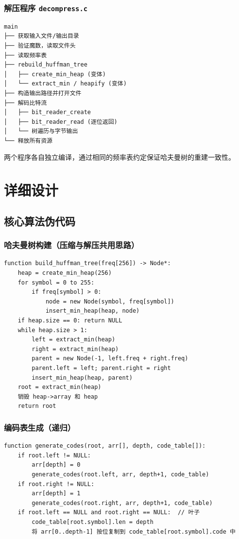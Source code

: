 \documentclass[UTF8]{ctexart}
\begin{document}
\subsubsection{解压程序 \texttt{decompress.c}}
\begin{verbatim}
main
├── 获取输入文件/输出目录
├── 验证魔数，读取文件头
├── 读取频率表
├── rebuild_huffman_tree
│   ├── create_min_heap (变体)
│   └── extract_min / heapify (变体)
├── 构造输出路径并打开文件
├── 解码比特流
│   ├── bit_reader_create
│   ├── bit_reader_read (逐位返回)
│   └── 树遍历与字节输出
└── 释放所有资源
\end{verbatim}

两个程序各自独立编译，通过相同的频率表约定保证哈夫曼树的重建一致性。

\section{详细设计}

\subsection{核心算法伪代码}

\subsubsection{哈夫曼树构建（压缩与解压共用思路）}
\begin{lstlisting}
function build_huffman_tree(freq[256]) -> Node*:
    heap = create_min_heap(256)
    for symbol = 0 to 255:
        if freq[symbol] > 0:
            node = new Node(symbol, freq[symbol])
            insert_min_heap(heap, node)
    if heap.size == 0: return NULL
    while heap.size > 1:
        left = extract_min(heap)
        right = extract_min(heap)
        parent = new Node(-1, left.freq + right.freq)
        parent.left = left; parent.right = right
        insert_min_heap(heap, parent)
    root = extract_min(heap)
    销毁 heap->array 和 heap
    return root
\end{lstlisting}

\subsubsection{编码表生成（递归）}
\begin{lstlisting}
function generate_codes(root, arr[], depth, code_table[]):
    if root.left != NULL:
        arr[depth] = 0
        generate_codes(root.left, arr, depth+1, code_table)
    if root.right != NULL:
        arr[depth] = 1
        generate_codes(root.right, arr, depth+1, code_table)
    if root.left == NULL and root.right == NULL:  // 叶子
        code_table[root.symbol].len = depth
        将 arr[0..depth-1] 按位复制到 code_table[root.symbol].code 中
\end{lstlisting}
\end{document}
